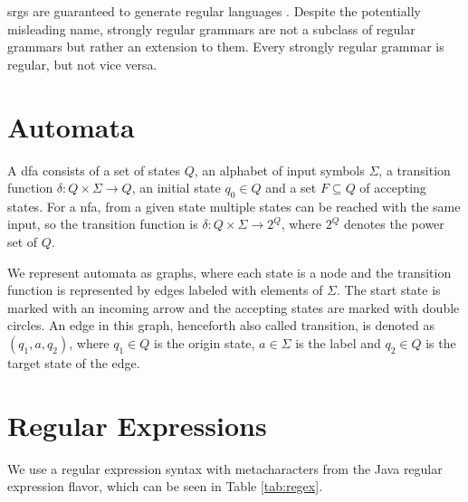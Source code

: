 \Aclp{srg} are guaranteed to generate regular languages \cite{mohri_nederhof}.
Despite the potentially misleading name, strongly regular grammars are not a subclass of regular grammars but rather an extension to them. Every strongly regular grammar is regular, but not vice versa.

\section{Automata}\label{sec:background:automata}

A \acf{dfa} consists of a set of states $Q$, an alphabet of input symbols $\Sigma$, a transition function $\delta: Q \times \Sigma \rightarrow Q$, an initial state $q_0 \in Q$ and a set $F \subseteq Q$ of accepting states.
For a \acf{nfa}, from a given state multiple states can be reached with the same input, so the transition function is  $\delta: Q \times \Sigma \rightarrow 2^Q$, where $2^Q$ denotes the power set of $Q$.

We represent automata as graphs, where each state is a node and the transition function is represented by edges labeled with elements of $\Sigma$. The start state is marked with an incoming arrow and the accepting states are marked with double circles.
An edge in this graph, henceforth also called transition, is denoted as $(q_1, a, q_2)$, where $q_1 \in Q$ is the origin state, $a \in \Sigma$ is the label and $q_2 \in Q$ is the target state of the edge.

\newpage
\section{Regular Expressions}\label{sec:background:regex}

We use a regular expression syntax with metacharacters from the Java regular expression flavor, which can be seen in Table \ref{tab:regex}.


